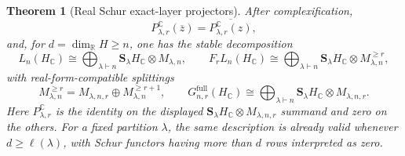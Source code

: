 \documentclass[10pt,reqno]{amsart}
\theoremstyle{plain}
\newtheorem{theorem}{Theorem}[section]
\theoremstyle{definition}
\theoremstyle{remark}
\begin{document}
\begin{theorem}[Real Schur exact-layer projectors]
After complexification,
\begin{equation}
 P_{\lambda,r}^{\mathbb C}(\overline z)
 =\overline{P_{\lambda,r}^{\mathbb C}(z)},
 \label{cc:eq-projector-real-form}
\end{equation}
and, for \(d=\dim_{\mathbb R}H\geq n\), one has the stable decomposition
\begin{equation}
 L_n(H_{\mathbb C})
 \cong
 \bigoplus_{\lambda\vdash n}
 \mathbf S_\lambda H_{\mathbb C}\otimes M_{\lambda,n},
 \qquad
 F_rL_n(H_{\mathbb C})
 \cong
 \bigoplus_{\lambda\vdash n}
 \mathbf S_\lambda H_{\mathbb C}\otimes M^{\geq r}_{\lambda,n},
 \label{cc:eq-schur-ancestry-filtration}
\end{equation}
with real-form-compatible splittings
\begin{equation}
 M^{\geq r}_{\lambda,n}
 =M_{\lambda,n,r}\oplus M^{\geq r+1}_{\lambda,n},
 \qquad
 G^{\mathrm{full}}_{n,r}(H_{\mathbb C})
 \cong\bigoplus_{\lambda\vdash n}
 \mathbf S_\lambda H_{\mathbb C}\otimes M_{\lambda,n,r}.
 \label{cc:eq-schur-exact-layers}
\end{equation}
Here \(P_{\lambda,r}^{\mathbb C}\) is the identity on the displayed
\(\mathbf S_\lambda H_{\mathbb C}\otimes M_{\lambda,n,r}\) summand and
zero on the others.  For a fixed partition \(\lambda\), the same
description is already valid whenever \(d\geq\ell(\lambda)\), with
Schur functors having more than \(d\) rows interpreted as zero.
\end{theorem}
\end{document}

